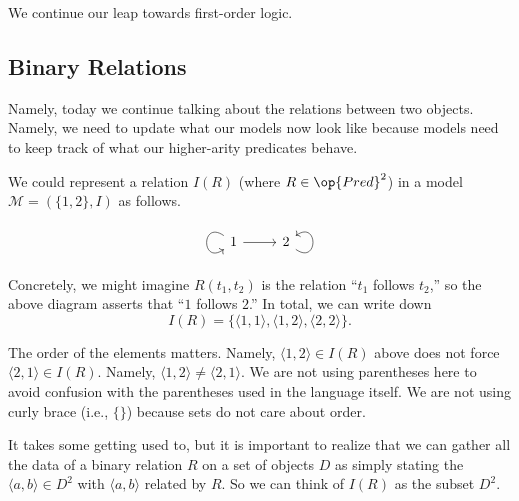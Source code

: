 
We continue our leap towards first-order logic.

\subsection{Binary Relations}
Namely, today we continue talking about the relations between two objects. Namely, we need to update what our models now look like because models need to keep track of what our higher-arity predicates behave.
\begin{example} \label{ex:binrelation}
	We could represent a relation $I(R)$ (where $R\in\op{Pred}^2$) in a model $\mathcal M=(\{1,2\},I)$ as follows.
	\[\begin{tikzcd}
		1 \arrow[r] \arrow[loop, distance=2em, in=215, out=145] & 2 \arrow[loop, distance=2em, in=35, out=325]
	\end{tikzcd}\]
	Concretely, we might imagine $R(t_1,t_2)$ is the relation ``$t_1$ follows $t_2$,'' so the above diagram asserts that ``$1$ follows $2$.'' In total, we can write down
	\[I(R)=\{\langle1,1\rangle,\langle1,2\rangle,\langle2,2\rangle\}.\]
\end{example}
\begin{remark}
	The order of the elements matters. Namely, $\langle1,2\rangle\in I(R)$ above does not force $\langle2,1\rangle\in I(R)$. Namely, $\langle1,2\rangle\ne\langle2,1\rangle$. We are not using parentheses here to avoid confusion with the parentheses used in the language itself. We are not using curly brace (i.e., $\{\}$) because sets do not care about order.
\end{remark}
It takes some getting used to, but it is important to realize that we can gather all the data of a binary relation $R$ on a set of objects $D$ as simply stating the $\langle a,b\rangle\in D^2$ with $\langle a,b\rangle$ related by $R$. So we can think of $I(R)$ as the subset $D^2$.


